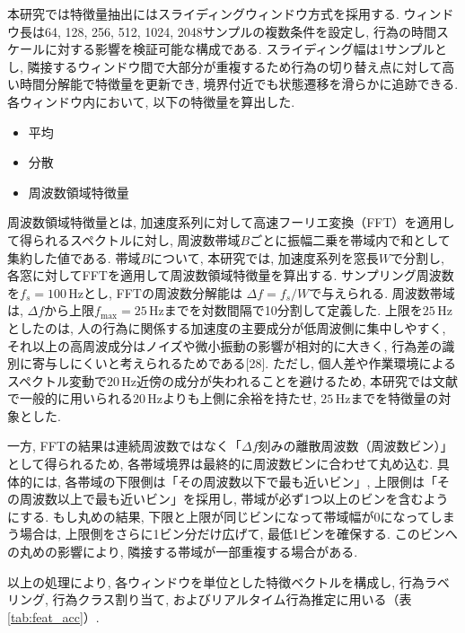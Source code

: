 \documentclass[a4paper,12pt]{jreport}
\begin{document}
本研究では特徴量抽出にはスライディングウィンドウ方式を採用する. ウィンドウ長は64, 128, 256, 512, 1024, 2048サンプルの複数条件を設定し, 行為の時間スケールに対する影響を検証可能な構成である. スライディング幅は1サンプルとし, 隣接するウィンドウ間で大部分が重複するため行為の切り替え点に対して高い時間分解能で特徴量を更新でき, 境界付近でも状態遷移を滑らかに追跡できる. 
各ウィンドウ内において, 以下の特徴量を算出した. 
\begin{itemize}
    \item 平均
    \item 分散
    \item 周波数領域特徴量
\end{itemize}
周波数領域特徴量とは, 加速度系列に対して高速フーリエ変換（FFT）を適用して得られるスペクトルに対し, 周波数帯域$B$ごとに振幅二乗を帯域内で和として集約した値である. 帯域$B$について, 本研究では, 加速度系列を窓長$W$で分割し, 各窓に対してFFTを適用して周波数領域特徴量を算出する. サンプリング周波数を$f_s=100\,\mathrm{Hz}$とし, FFTの周波数分解能は $\Delta f=f_s/W$で与えられる. 周波数帯域は, $\Delta f$から上限$f_{\max}=25\,\mathrm{Hz}$までを対数間隔で10分割して定義した. 上限を$25\,\mathrm{Hz}$としたのは, 人の行為に関係する加速度の主要成分が低周波側に集中しやすく, それ以上の高周波成分はノイズや微小振動の影響が相対的に大きく, 行為差の識別に寄与しにくいと考えられるためである[28]. ただし, 個人差や作業環境によるスペクトル変動で$20\,\mathrm{Hz}$近傍の成分が失われることを避けるため, 本研究では文献で一般的に用いられる$20\,\mathrm{Hz}$よりも上側に余裕を持たせ, $25\,\mathrm{Hz}$までを特徴量の対象とした.

一方, FFTの結果は連続周波数ではなく「$\Delta f$刻みの離散周波数（周波数ビン）」として得られるため, 各帯域境界は最終的に周波数ビンに合わせて丸め込む. 具体的には, 各帯域の下限側は「その周波数以下で最も近いビン」, 上限側は「その周波数以上で最も近いビン」を採用し, 帯域が必ず1つ以上のビンを含むようにする. もし丸めの結果, 下限と上限が同じビンになって帯域幅が0になってしまう場合は, 上限側をさらに1ビン分だけ広げて, 最低1ビンを確保する. このビンへの丸めの影響により, 隣接する帯域が一部重複する場合がある.

以上の処理により, 各ウィンドウを単位とした特徴ベクトルを構成し, 行為ラベリング, 行為クラス割り当て, およびリアルタイム行為推定に用いる（表\ref{tab:feat_acc}）.
\end{document}
